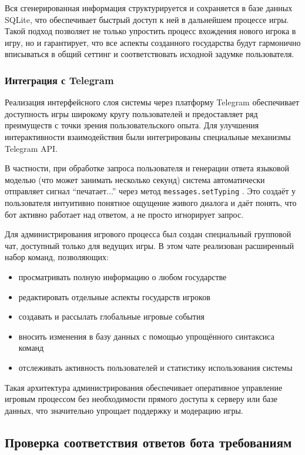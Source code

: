 Вся сгенерированная информация структурируется и сохраняется в базе данных SQLite, что обеспечивает быстрый доступ к ней в дальнейшем процессе игры. Такой подход позволяет не только упростить процесс вхождения нового игрока в игру, но и гарантирует, что все аспекты созданного государства будут гармонично вписываться в общий сеттинг и соответствовать исходной задумке пользователя.

\subsubsection{Интеграция с Telegram}

Реализация интерфейсного слоя системы через платформу Telegram обеспечивает доступность игры широкому кругу пользователей и предоставляет ряд преимуществ с точки зрения пользовательского опыта. Для улучшения интерактивности взаимодействия были интегрированы специальные механизмы Telegram API.

В частности, при обработке запроса пользователя и генерации ответа языковой моделью (что может занимать несколько секунд) система автоматически отправляет сигнал ``печатает...'' через метод \texttt{messages.setTyping} \cite{telegram_typing}. Это создаёт у пользователя интуитивно понятное ощущение живого диалога и даёт понять, что бот активно работает над ответом, а не просто игнорирует запрос.

Для администрирования игрового процесса был создан специальный групповой чат, доступный только для ведущих игры. В этом чате реализован расширенный набор команд, позволяющих:
\begin{itemize}
\item просматривать полную информацию о любом государстве
\item редактировать отдельные аспекты государств игроков
\item создавать и рассылать глобальные игровые события
\item вносить изменения в базу данных с помощью упрощённого синтаксиса команд
\item отслеживать активность пользователей и статистику использования системы
\end{itemize}

Такая архитектура администрирования обеспечивает оперативное управление игровым процессом без необходимости прямого доступа к серверу или базе данных, что значительно упрощает поддержку и модерацию игры.

\subsection{Проверка соответствия ответов бота требованиям}

